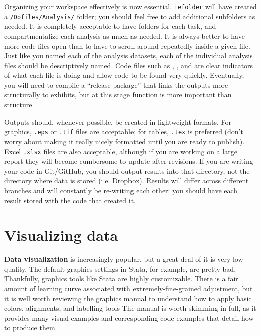 Organizing your workspace effectively is now essential.
\texttt{iefolder} will have created a \texttt{/Dofiles/Analysis/} folder;
you should feel free to add additional subfolders as needed.
It is completely acceptable to have folders for each task,
and compartmentalize each analysis as much as needed.
It is always better to have more code files open
than to have to scroll around repeatedly inside a given file.
Just like you named each of the analysis datasets,
each of the individual analysis files should be descriptively named.
Code files such as ,
, and 
are clear indicators of what each file is doing
and allow code to be found very quickly.
Eventually, you will need to compile a ``release package''
that links the outputs more structurally to exhibits,
but at this stage function is more important than structure.

Outputs should, whenever possible, be created in lightweight formats.
For graphics, \texttt{.eps} or \texttt{.tif} files are acceptable;
for tables, \texttt{.tex} is preferred (don't worry about making it
really nicely formatted until you are ready to publish).
Excel \texttt{.xlsx} files are also acceptable,
although if you are working on a large report
they will become cumbersome to update after revisions.
If you are writing your code in Git/GitHub,
you should output results into that directory,
not the directory where data is stored (i.e. Dropbox).
Results will differ across different branches
and will constantly be re-writing each other:
you should have each result stored with the code that created it.


\section{Visualizing data}

\textbf{Data visualization} is increasingly popular,
but a great deal of it is very low quality.\cite{healy2018data,wilke2019fundamentals}
The default graphics settings in Stata, for example,
are pretty bad.
Thankfully, graphics tools like Stata are highly customizable.
There is a fair amount of learning curve associated with
extremely-fine-grained adjustment,
but it is well worth reviewing the graphics manual
to understand how to apply basic colors, alignments, and labelling tools
The manual is worth skimming in full, as it provides
many visual examples and corresponding code examples
that detail how to produce them.

